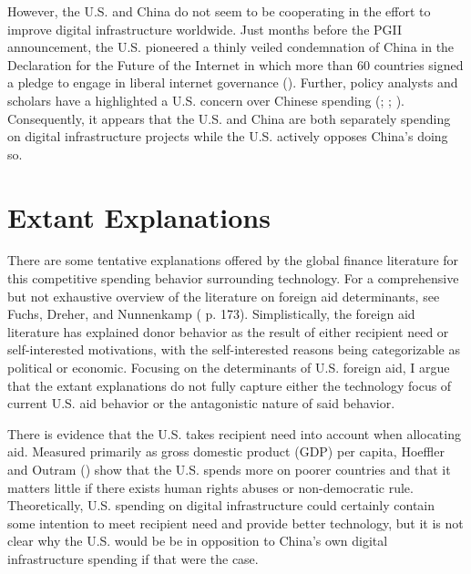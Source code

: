 \documentclass[12pt]{article}
\begin{document}
However, the U.S. and China do not seem to be cooperating in the effort to improve digital infrastructure worldwide. Just months before the PGII announcement, the U.S. pioneered a thinly veiled condemnation of China in the Declaration for the Future of the Internet in which more than 60 countries signed a pledge to engage in liberal internet governance (\cite{u.s.departmentofstate2022}). Further, policy analysts and scholars have a highlighted a U.S. concern over Chinese spending (\cite{hass2021}; \cite{triolo2020}; \cite{hillman2021}). Consequently, it appears that the U.S. and China are both separately spending on digital infrastructure projects while the U.S. actively opposes China's doing so.

\section*{Extant Explanations}
There are some tentative explanations offered by the global finance literature for this competitive spending behavior surrounding technology. For a comprehensive but not exhaustive overview of the literature on foreign aid determinants, see Fuchs, Dreher, and Nunnenkamp (\citeyear{fuchs2014} p. 173). Simplistically, the foreign aid literature has explained donor behavior as the result of either recipient need or self-interested motivations, with the self-interested reasons being categorizable as political or economic. Focusing on the determinants of U.S. foreign aid, I argue that the extant explanations do not fully capture either the technology focus of current U.S. aid behavior or the antagonistic nature of said behavior. 

There is evidence that the U.S. takes recipient need into account when allocating aid. Measured primarily as gross domestic product (GDP) per capita, Hoeffler and Outram (\citeyear{hoeffler2011}) show that the U.S. spends more on poorer countries and that it matters little if there exists human rights abuses or non-democratic rule. Theoretically, U.S. spending on digital infrastructure could certainly contain some intention to meet recipient need and provide better technology, but it is not clear why the U.S. would be be in opposition to China's own digital infrastructure spending if that were the case. %
\end{document}
